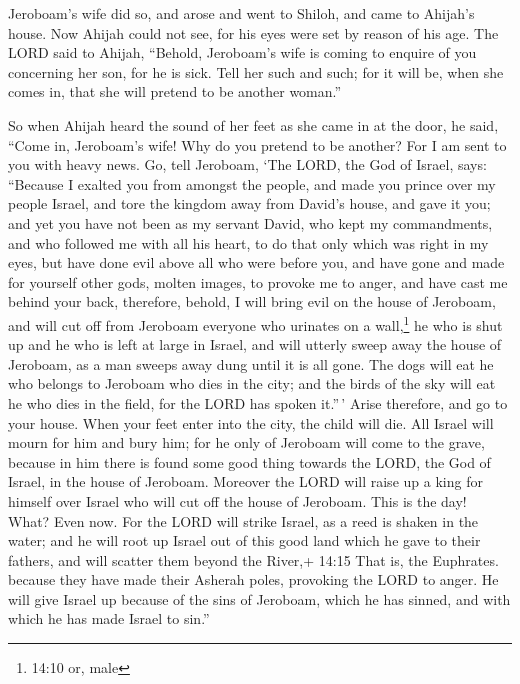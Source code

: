  Jeroboam's wife did so, and arose and went to Shiloh, and
came to Ahijah's house. Now Ahijah could not see, for his eyes were set
by reason of his age.  The LORD said to Ahijah, ``Behold,
Jeroboam's wife is coming to enquire of you concerning her son, for he
is sick. Tell her such and such; for it will be, when she comes in, that
she will pretend to be another woman.''

 So when Ahijah heard the sound of her feet as she came in
at the door, he said, ``Come in, Jeroboam's wife! Why do you pretend to
be another? For I am sent to you with heavy news.  Go, tell
Jeroboam, `The LORD, the God of Israel, says: ``Because I exalted you
from amongst the people, and made you prince over my people Israel,
 and tore the kingdom away from David's house, and gave it
you; and yet you have not been as my servant David, who kept my
commandments, and who followed me with all his heart, to do that only
which was right in my eyes,  but have done evil above all
who were before you, and have gone and made for yourself other gods,
molten images, to provoke me to anger, and have cast me behind your
back,  therefore, behold, I will bring evil on the house of
Jeroboam, and will cut off from Jeroboam everyone who urinates on a
wall,\footnote{14:10 or, male} he who is shut up and he who is left at
large in Israel, and will utterly sweep away the house of Jeroboam, as a
man sweeps away dung until it is all gone.  The dogs will
eat he who belongs to Jeroboam who dies in the city; and the birds of
the sky will eat he who dies in the field, for the LORD has spoken
it.''\,'  Arise therefore, and go to your house. When your
feet enter into the city, the child will die.  All Israel
will mourn for him and bury him; for he only of Jeroboam will come to
the grave, because in him there is found some good thing towards the
LORD, the God of Israel, in the house of Jeroboam. 
Moreover the LORD will raise up a king for himself over Israel who will
cut off the house of Jeroboam. This is the day! What? Even now.
 For the LORD will strike Israel, as a reed is shaken in
the water; and he will root up Israel out of this good land which he
gave to their fathers, and will scatter them beyond the River,+ 14:15
That is, the Euphrates. because they have made their Asherah poles,
provoking the LORD to anger.  He will give Israel up
because of the sins of Jeroboam, which he has sinned, and with which he
has made Israel to sin.''

